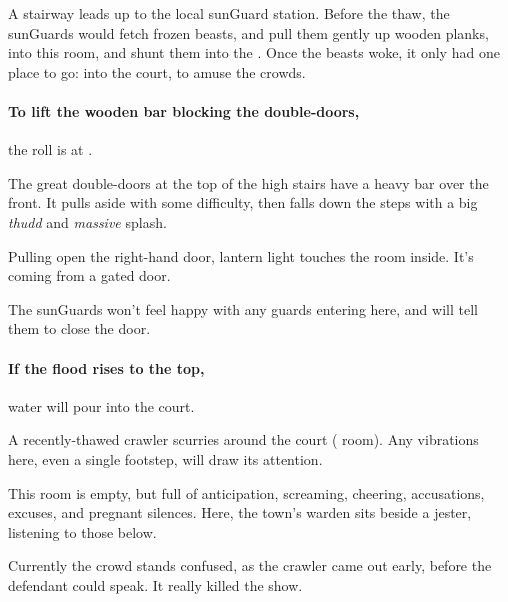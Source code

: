 \begin{multicols}{2}


\begin{exampletext}
  A stairway leads up to the local \gls{sunGuard} station.
  Before the thaw, the \glspl{sunGuard} would fetch frozen beasts, and pull them gently up wooden planks, into this room, and shunt them into the .
  Once the beasts woke, it only had one place to go: into the \gls{court}, to amuse the crowds.
\end{exampletext}

\paragraph{To lift the wooden bar blocking the double-doors,}
the roll is  at \tn[7].

\begin{boxtext}
  The great double-doors at the top of the high stairs have a heavy bar over the front.
  It pulls aside with some difficulty, then falls down the steps with a big \emph{thudd} and \emph{massive} splash.

  Pulling open the right-hand door, lantern light touches the room inside.
  It's coming from a gated door.
\end{boxtext}

The \glspl{sunGuard} won't feel happy with any \glspl{guard} entering here, and will tell them to close the door.

\paragraph{If the flood rises to the top,}
water will pour into the \gls{court}.


A recently-thawed \gls{crawler} scurries around the \gls{court} ( room).
Any vibrations here, even a single footstep, will draw its attention.


\begin{exampletext}
  This room is empty, but full of anticipation, screaming, cheering, accusations, excuses, and pregnant silences.
  Here, the town's \gls{warden} sits beside a jester, listening to those below.
\end{exampletext}

Currently the crowd stands confused, as the \gls{crawler} came out early, before the defendant could speak.
It really killed the show.

\chitincrawler

\end{multicols}

